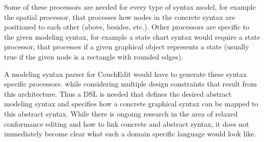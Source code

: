 \documentclass[10pt,a4paper,oneside]{scrartcl}
\begin{document}
Some of these processors are needed for every type of syntax model, for example the spatial processor, that processes how nodes in the concrete syntax are positioned to each other (above, besides, etc.). Other processors are specific to the given modeling syntax, for example a state chart syntax would require a state processor, that processes if a given graphical object represents a state (usually true if the given node is a rectangle with rounded edges).

A modeling syntax parser for CouchEdit would have to generate these syntax specific processors. while considering multiple design constraints that result from this architecture. Thus a DSL is needed that defines the desired abstract modeling syntax and specifies how a concrete graphical syntax can be mapped to this abstract syntax. While there is ongoing research in the area of relaxed conformance editing and how to link concrete and abstract syntax, it does not immediately become clear what such a domain specific language would look like.







\end{document}
